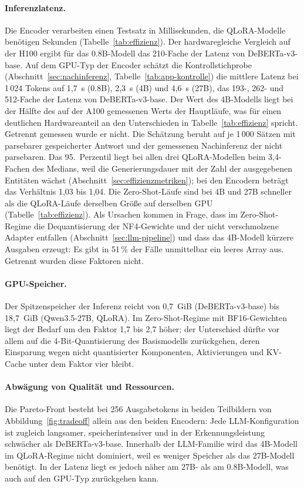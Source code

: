 \paragraph{Inferenzlatenz.}
Die Encoder verarbeiten einen Testsatz in Millisekunden, die
QLoRA-Modelle benötigen Sekunden (Tabelle~\ref{tab:effizienz}).
Der hardwaregleiche Vergleich auf der H100 ergibt für das 0.8B-Modell
das 210-Fache der Latenz von DeBERTa-v3-base.
Auf dem GPU-Typ der Encoder schätzt die Kontrollstichprobe
(Abschnitt~\ref{sec:nachinferenz}, Tabelle~\ref{tab:app-kontrolle}) die
mittlere Latenz bei 1\,024 Tokens auf 1,7~s (0.8B), 2,3~s (4B) und
4,6~s (27B), das 193-, 262- und 512-Fache der Latenz von
DeBERTa-v3-base.
Der Wert des 4B-Modells liegt bei der Hälfte des auf der A100 gemessenen
Werts der Hauptläufe, was für einen deutlichen Hardwareanteil an den
Unterschieden in Tabelle~\ref{tab:effizienz} spricht. Getrennt gemessen
wurde er nicht.
Die Schätzung beruht auf je 1\,000 Sätzen mit parsebarer gespeicherter
Antwort und der gemessenen Nachinferenz der nicht parsebaren.
Das 95.~Perzentil liegt bei allen drei QLoRA-Modellen beim 3,4-Fachen
des Medians, weil die Generierungsdauer mit der Zahl der ausgegebenen
Entitäten wächst (Abschnitt~\ref{sec:effizienzmetriken}); bei den
Encodern beträgt das Verhältnis 1,03 bis 1,04.
Die Zero-Shot-Läufe sind bei 4B und 27B schneller als die QLoRA-Läufe
derselben Größe auf derselben GPU (Tabelle~\ref{tab:effizienz}).
Als Ursachen kommen in Frage, dass im Zero-Shot-Regime die
Dequantisierung der NF4-Gewichte und der nicht verschmolzene Adapter
entfallen (Abschnitt~\ref{sec:llm-pipeline}) und dass das 4B-Modell
kürzere Ausgaben erzeugt: Es gibt in 51\,\% der Fälle unmittelbar ein
leeres Array aus. Getrennt wurden diese Faktoren nicht.

\paragraph{GPU-Speicher.}
Der Spitzenspeicher der Inferenz reicht von 0,7~GiB (DeBERTa-v3-base)
bis 18,7~GiB (Qwen3.5-27B, QLoRA).
Im Zero-Shot-Regime mit BF16-Gewichten liegt der Bedarf um den Faktor
1,7 bis 2,7 höher; der Unterschied dürfte vor allem auf die
4-Bit-Quantisierung des Basismodells zurückgehen, deren Einsparung wegen
nicht quantisierter Komponenten, Aktivierungen und KV-Cache unter dem
Faktor vier bleibt.

\paragraph{Abwägung von Qualität und Ressourcen.}
Die Pareto-Front besteht bei 256 Ausgabetokens in beiden Teilbildern
von Abbildung~\ref{fig:tradeoff} allein aus den beiden Encodern: Jede LLM-Konfiguration ist zugleich langsamer,
speicherintensiver und in der Erkennungsleistung schwächer als
DeBERTa-v3-base.
Innerhalb der LLM-Familie wird das 4B-Modell im QLoRA-Regime nicht
dominiert, weil es weniger Speicher als das 27B-Modell benötigt. In der
Latenz liegt es jedoch näher am 27B- als am 0.8B-Modell, was auch auf
den GPU-Typ zurückgehen kann.

